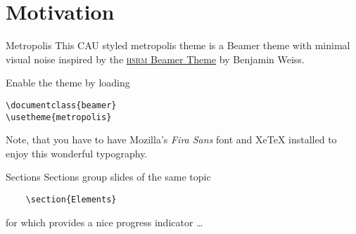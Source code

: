 \section{Motivation}

\begin{frame}[fragile]{Metropolis}
	This CAU styled metropolis theme is a Beamer theme with minimal visual noise
	inspired by the \href{https://github.com/hsrmbeamertheme/hsrmbeamertheme}{\textsc{hsrm} Beamer
		Theme} by Benjamin Weiss.
	
	Enable the theme by loading
	
	\begin{verbatim}    
\documentclass{beamer}
\usetheme{metropolis}\end{verbatim}
	
	Note, that you have to have Mozilla's \emph{Fira Sans} font and XeTeX
	installed to enjoy this wonderful typography.
\end{frame}

\begin{frame}[fragile]{Sections}
	Sections group slides of the same topic
	
	\begin{verbatim}    \section{Elements}\end{verbatim}
	
	for which  provides a nice progress indicator \ldots
\end{frame}